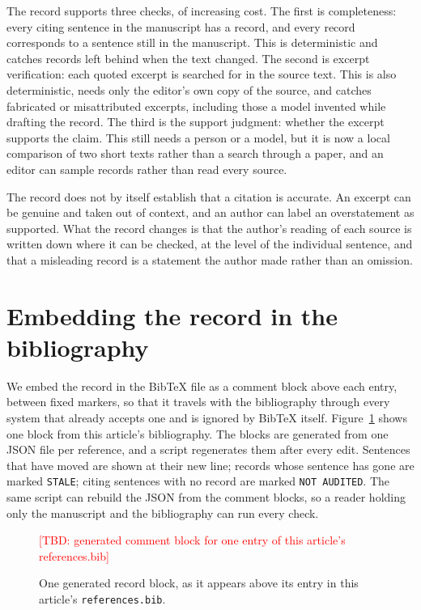 \documentclass[11pt]{article}
\newcommand{\TBD}[1]{\textcolor{red}{[TBD: #1]}}
\begin{document}
The record supports three checks, of increasing cost. The first is completeness: every citing sentence in the manuscript has a record, and every record corresponds to a sentence still in the manuscript. This is deterministic and catches records left behind when the text changed. The second is excerpt verification: each quoted excerpt is searched for in the source text. This is also deterministic, needs only the editor's own copy of the source, and catches fabricated or misattributed excerpts, including those a model invented while drafting the record. The third is the support judgment: whether the excerpt supports the claim. This still needs a person or a model, but it is now a local comparison of two short texts rather than a search through a paper, and an editor can sample records rather than read every source.

The record does not by itself establish that a citation is accurate. An excerpt can be genuine and taken out of context, and an author can label an overstatement as supported. What the record changes is that the author's reading of each source is written down where it can be checked, at the level of the individual sentence, and that a misleading record is a statement the author made rather than an omission.

\section{Embedding the record in the bibliography}

We embed the record in the BibTeX file as a comment block above each entry, between fixed markers, so that it travels with the bibliography through every system that already accepts one and is ignored by BibTeX itself. Figure~\ref{fig:example} shows one block from this article's bibliography. The blocks are generated from one JSON file per reference, and a script regenerates them after every edit. Sentences that have moved are shown at their new line; records whose sentence has gone are marked \texttt{STALE}; citing sentences with no record are marked \texttt{NOT AUDITED}. The same script can rebuild the JSON from the comment blocks, so a reader holding only the manuscript and the bibliography can run every check.

\begin{figure}[t]
\centering
\TBD{generated comment block for one entry of this article's references.bib}
\caption{One generated record block, as it appears above its entry in this article's \texttt{references.bib}.}
\label{fig:example}
\end{figure}
\end{document}
